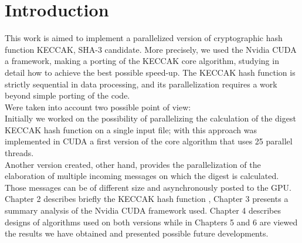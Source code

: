 \chapter{Introduction} \label{chap:introduction}

This work is aimed to implement a parallelized version of cryptographic hash function KECCAK, SHA-3 candidate.
More precisely, we used the Nvidia CUDA a framework, making a porting of the KECCAK core algorithm,
studying in detail how to achieve the best possible speed-up.
The KECCAK hash function is strictly sequential in data processing, and its parallelization requires a work
beyond simple porting of the code.\\

Were taken into account two possible point of view:\\
Initially we worked on the possibility of parallelizing the calculation of the digest KECCAK hash function on a single input file;
with this approach was implemented in CUDA a first version of the core algorithm that uses 25 parallel threads.\\
Another version created, other hand, provides the parallelization of the elaboration of multiple incoming messages on which the digest is calculated.
Those messages can be of different size and asynchronously posted to the GPU.\\

Chapter 2 describes briefly the KECCAK hash function , Chapter 3 presents a summary analysis of the Nvidia CUDA framework
used. Chapter 4 describes designs of algorithms used on both versions while in Chapters 5 and 6 are
viewed the results we have obtained and presented possible future developments.\\
